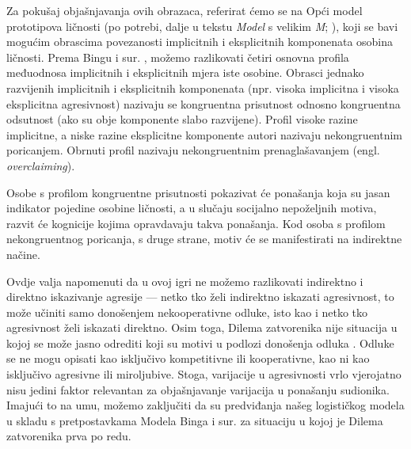 \documentclass[a4paper, 12pt]{report}
\begin{document}
Za pokušaj objašnjavanja ovih obrazaca, referirat ćemo se na 
Opći model prototipova ličnosti (po potrebi, dalje u tekstu \emph{Model} s
velikim \emph{M}; \citealp{bing2007integrating}), koji se bavi 
mogućim obrascima povezanosti implicitnih i eksplicitnih komponenata osobina
ličnosti.
Prema Bingu i sur. \citeyearpar{bing2007integrating}, možemo razlikovati četiri osnovna profila
međuodnosa implicitnih i eksplicitnih mjera iste osobine. Obrasci jednako
razvijenih
implicitnih i eksplicitnih komponenata (npr. visoka implicitna i
visoka eksplicitna agresivnost) nazivaju se kongruentna prisutnost odnosno
kongruentna odsutnost (ako su obje komponente slabo razvijene). 
Profil visoke razine implicitne, a niske
razine eksplicitne komponente autori nazivaju nekongruentnim poricanjem. Obrnuti profil
nazivaju nekongruentnim prenaglašavanjem (engl. \textit{overclaiming}). 

Osobe s profilom kongruentne prisutnosti pokazivat
će ponašanja koja su jasan indikator pojedine osobine ličnosti, a u slučaju
socijalno nepoželjnih motiva, razvit će kognicije kojima opravdavaju takva
ponašanja. Kod osoba s profilom nekongruentnog poricanja, s druge strane, motiv
će se manifestirati na indirektne načine. 

Ovdje valja
napomenuti da u ovoj igri ne možemo razlikovati indirektno i direktno
iskazivanje agresije --- netko tko želi indirektno iskazati agresivnost, to može
učiniti samo donošenjem nekooperativne odluke, isto kao i netko tko agresivnost želi
iskazati direktno.
Osim toga, Dilema zatvorenika nije situacija u
kojoj se može jasno odrediti koji su motivi u podlozi donošenja odluka \citep{colgt}.
Odluke se ne mogu opisati kao isključivo kompetitivne ili kooperativne, kao ni
kao isključivo agresivne ili miroljubive. Stoga, varijacije u agresivnosti
vrlo vjerojatno nisu jedini faktor relevantan za objašnjavanje varijacija u
ponašanju sudionika. 
Imajući to na umu, možemo
zaključiti da su predviđanja našeg logističkog modela u skladu s pretpostavkama 
Modela Binga i sur. \citeyearpar{bing2007integrating}
za situaciju u kojoj je Dilema zatvorenika prva po redu. 
\end{document}
